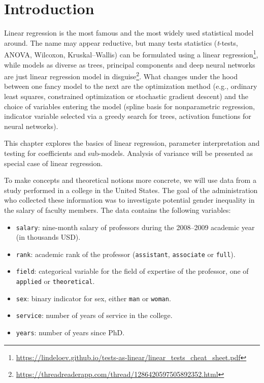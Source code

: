 \documentclass[
  11pt,
  letterpaper,
]{book}
\providecommand{\tightlist}{%
  \setlength{\itemsep}{0pt}\setlength{\parskip}{0pt}}
\renewcommand{\href}[2]{#2\footnote{\url{#1}}}
\theoremstyle{definition}
\theoremstyle{definition}
\theoremstyle{definition}
\theoremstyle{definition}
\theoremstyle{remark}
\begin{document}
\hypertarget{introduction}{%
\section{Introduction}\label{introduction}}

Linear regression is the most famous and the most widely used statistical model around. The name may appear reductive, but many tests statistics (\emph{t}-tests, ANOVA, Wilcoxon, Kruskal--Wallis) \href{https://lindeloev.github.io/tests-as-linear/linear_tests_cheat_sheet.pdf}{can be formulated using a linear regression}, while \href{https://threadreaderapp.com/thread/1286420597505892352.html}{models as diverse as trees, principal components and deep neural networks are just linear regression model in disguise}. What changes under the hood between one fancy model to the next are the optimization method (e.g., ordinary least squares, constrained optimization or stochastic gradient descent) and the choice of variables entering the model (spline basis for nonparametric regression, indicator variable selected via a greedy search for trees, activation functions for neural networks).

This chapter explores the basics of linear regression, parameter interpretation and testing for coefficients and sub-models. Analysis of variance will be presented as special case of linear regression.

To make concepts and theoretical notions more concrete, we will use data from a study performed in a college in the United States. The goal of the administration who collected these information was to investigate potential gender inequality in the salary of faculty members. The data contains the following variables:

\begin{itemize}
\tightlist
\item
  \texttt{salary}: nine-month salary of professors during the 2008--2009 academic year (in thousands USD).
\item
  \texttt{rank}: academic rank of the professor (\texttt{assistant}, \texttt{associate} or \texttt{full}).
\item
  \texttt{field}: categorical variable for the field of expertise of the professor, one of \texttt{applied} or \texttt{theoretical}.
\item
  \texttt{sex}: binary indicator for sex, either \texttt{man} or \texttt{woman}.
\item
  \texttt{service}: number of years of service in the college.
\item
  \texttt{years}: number of years since PhD.
\end{itemize}
\end{document}
